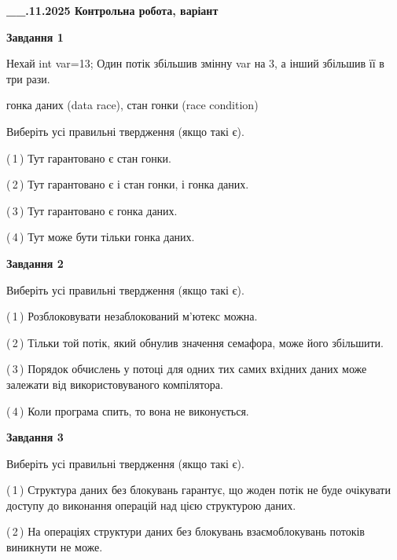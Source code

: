\documentclass[12pt, ukrainian]{article}
\begin{document}
\begin {large}

\textbf{\_\_.11.2025 Контрольна робота, варіант  }\par


{

\begin{center}
\textbf{Завдання 1}
\end{center}
Нехай int var=13; Один потік збільшив змінну var на 3, а інший збільшив її в три рази.

гонка даних (data race), стан гонки (race condition)

Виберіть усі правильні твердження (якщо такі є).\par
\vspace{2mm}
(\,1\,) Тут гарантовано є стан гонки.%

(\,2\,) Тут гарантовано є і стан гонки, і гонка даних.%

(\,3\,) Тут гарантовано є гонка даних.%

(\,4\,) Тут може бути тільки гонка даних.%



\begin{center}
\textbf{Завдання 2}
\end{center}
Виберіть усі правильні твердження (якщо такі є).\par
\vspace{2mm}

(\,1\,) Розблоковувати незаблокований м’ютекс можна.%

(\,2\,) Тільки той потік, який обнулив значення семафора, може його збільшити.%

(\,3\,) Порядок обчислень у потоці для одних тих самих вхідних даних може залежати від використовуваного компілятора.%

(\,4\,) Коли програма спить, то вона не виконується.%



\begin{center}
\textbf{Завдання 3}
\end{center}
Виберіть усі правильні твердження (якщо такі є).\par
\vspace{2mm}

(\,1\,) Структура даних без блокувань гарантує, що жоден потік не буде очікувати доступу до виконання операцій над цією структурою даних.%

(\,2\,) На операціях структури даних без блокувань взаємоблокувань потоків виникнути не може.%

}
\end{large}
\end{document}
